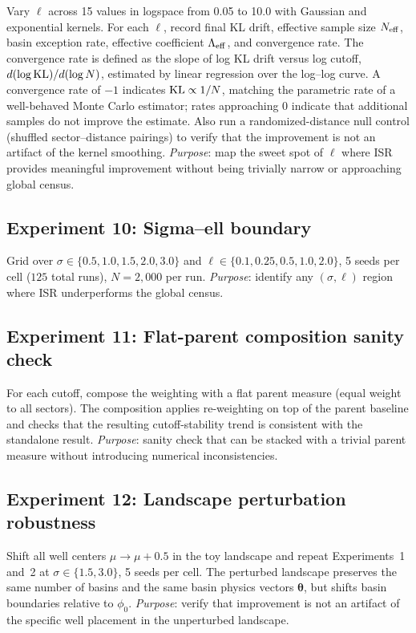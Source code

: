 Vary $\ell$ across 15 values in logspace from 0.05 to 10.0 with Gaussian and
exponential kernels.
For each $\ell$, record final KL drift, effective sample size $N_{\rm eff}$,
basin exception rate, effective coefficient $\Lambda_{\rm eff}$, and
convergence rate.
The convergence rate is defined as the slope of log KL drift versus log cutoff,
$d(\log{\rm KL}) / d(\log N)$, estimated by linear regression over the
log--log curve.
A convergence rate of $-1$ indicates ${\rm KL} \propto 1/N$, matching the
parametric rate of a well-behaved Monte Carlo estimator; rates approaching $0$
indicate that additional samples do not improve the estimate.
Also run a randomized-distance null control (shuffled sector--distance
pairings) to verify that the improvement is not an artifact of the kernel
smoothing.
\emph{Purpose}: map the sweet spot of $\ell$ where ISR provides meaningful
improvement without being trivially narrow or approaching global census.

\subsection{Experiment 10: Sigma--ell boundary}
\label{exp:10}

Grid over $\sigma \in \{0.5, 1.0, 1.5, 2.0, 3.0\}$ and
$\ell \in \{0.1, 0.25, 0.5, 1.0, 2.0\}$, 5 seeds per cell
($125$ total runs), $N = 2,\!000$ per run.
\emph{Purpose}: identify any $(\sigma, \ell)$ region where ISR underperforms
the global census.

\subsection{Experiment 11: Flat-parent composition sanity check}
\label{exp:11}

For each cutoff, compose the \ISR weighting with a flat parent measure
(equal weight to all sectors). The composition applies \ISR re-weighting
on top of the parent baseline and checks that the resulting
cutoff-stability trend is consistent with the standalone \ISR result.
\emph{Purpose}: sanity check that \ISR can be stacked with a trivial
parent measure without introducing numerical inconsistencies.

\subsection{Experiment 12: Landscape perturbation robustness}
\label{exp:12}

Shift all well centers $\mu \to \mu + 0.5$ in the toy landscape and repeat
Experiments~1 and~2 at $\sigma \in \{1.5, 3.0\}$, 5 seeds per cell.
The perturbed landscape preserves the same number of basins and the same 
basin physics vectors $\boldsymbol{\theta}$, but shifts basin boundaries
relative to $\phi_0$.
\emph{Purpose}: verify that \ISR improvement is not an artifact of the
specific well placement in the unperturbed landscape.
